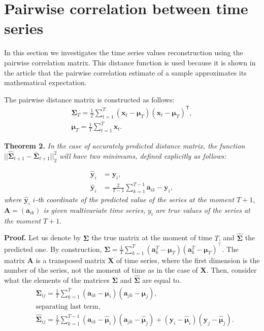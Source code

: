 \documentclass[12pt]{article}
\begin{document}
\section{Pairwise correlation between time series}

In this section we investigates the time series values reconstruction using the pairwise correlation matrix. This distance function is used because it is shown in the article \cite{puchkin2023sharper} that the pairwise correlation estimate of a sample approximates its mathematical expectation.

The pairwise distance matrix is constructed as follows:
\begin{gather*}
	{\mathbf{\Sigma}}_T = \frac{1}{T} \sum_{t=1}^{T} (\mathbf{x}_t - \boldsymbol{\mu}_T)(\mathbf{x}_t - \boldsymbol{\mu}_T)^\mathsf{T},\\
	\boldsymbol{\mu}_T = \frac{1}{T} \sum_{t=1}^{T} \mathbf{x}_t.
\end{gather*}

\textbf{Theorem 2.} \emph{In the case of accurately predicted distance matrix, the function} $||\hat{\mathbf{\Sigma}}_{t+1} - \bar{\mathbf{\Sigma}}_{t+1}||_2^2$ \emph{will have two minimums, defined explicitly as follows:}

\begin{align*}
	\hat{\mathbf{y}}_i &= \mathbf{y}_i,\\
	\hat{\mathbf{y}}_i &= \frac{2}{T-1} \sum_{k=1}^{T-1} \mathbf{a}_{ik} - \mathbf{y}_i,
\end{align*}
\emph{where} $\hat{\mathbf{y}}_i$ $i$\emph{-th coordinate of the predicted value of the series at the moment $T+1$, $\mathbf{A}=(\mathbf{a}_{ik})$ is given multivariate time series,} $y_i$ \emph{are true values of the series at the moment} $T+1$.

\textbf{Proof.} Let us denote by $\mathbf{\Sigma}$ the true matrix at the moment of time $T$, and $\hat{\mathbf{\Sigma}}$ the predicted one. By construction, ${\mathbf{\Sigma}} = \frac{1}{T} \sum_{k=1}^{T} (\mathbf{a}^T_k - \boldsymbol{\mu}_T)(\mathbf{a}^T_k - \boldsymbol{\mu}_T)^\intercal\texttt{}$. The matrix $\mathbf{A}$ is a transposed matrix $\mathbf{X}$ of time series, where the first dimension is the number of the series, not the moment of time as in the case of $\mathbf{X}$. Then, consider what the elements of the matrices $\mathbf{\Sigma}$ and $\hat{\mathbf{\Sigma}}$ are equal to.
\begin{align*}
	&\mathbf{\Sigma}_{ij} = \frac{1}{T}\sum_{k=1}^{T}(\mathbf{a}_{ik} - \boldsymbol{\mu}_i)(\mathbf{a}_{jk}-\boldsymbol{\mu}_j),\\
    &\text{separating last term,}\\
	&\hat{\mathbf{\Sigma}}_{ij} = \frac{1}{T}\sum_{k=1}^{T-1}(\mathbf{a}_{ik} - \hat{\boldsymbol{\mu}}_i)(\mathbf{a}_{jk}-\hat{\boldsymbol{\mu}}_j) + (\mathbf{y}_i - \hat{\boldsymbol{\mu}}_i)(\mathbf{y}_j - \hat{\boldsymbol{\mu}}_j).
\end{align*}
\end{document}
